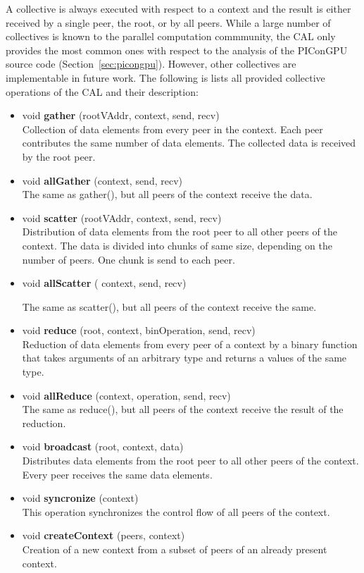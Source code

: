 A collective is always executed with respect to a context and the
result is either received by a single peer, the root, or by all peers.
While a large number of collectives is known to the parallel
computation commmunity, the CAL only provides the most common ones
with respect to the analysis of the PIConGPU source code
(Section~\ref{sec:picongpu}).  However, other collectives are 
implementable in future work. The following is lists all provided
collective operations of the CAL and their description:


\begin{itemize}
\item  void \textbf{gather} (rootVAddr, context, send, recv)\\
  Collection of data elements from every peer in the context. Each
  peer contributes the same number of data elements. The collected
  data is received by the root peer.

\item void \textbf{allGather} (context, send, recv)\\
  The same as gather(), but all peers of the context receive the data.

\item  void \textbf{scatter} (rootVAddr, context, send, recv)\\
  Distribution of data elements from the root peer to all other peers of
  the context. The data is divided into chunks of same
  size, depending on the number of peers. One chunk is send to each peer.
\item  void \textbf{allScatter} ( context, send, recv)

  The same as scatter(), but all peers of the context receive the same.

\item  void \textbf{reduce} (root, context, binOperation, send, recv)\\
  Reduction of data elements from every peer of a context
  by a binary function that takes arguments of an arbitrary type
  and returns a values of the same type.

\item  void \textbf{allReduce}  (context, operation, send, recv)\\
  The same as reduce(), but all peers of the context receive the
  result of the reduction.

\item  void \textbf{broadcast} (root, context, data)\\
  Distributes data elements from the root peer to all other peers of
  the context. Every peer receives the same data elements.

\item  void \textbf{syncronize} (context)\\
  This operation synchronizes the control flow of all peers of the
  context.

\item  void \textbf{createContext} (peers, context)\\ 
  Creation of a new context from a subset of peers of an already
  present context.

\end{itemize}

